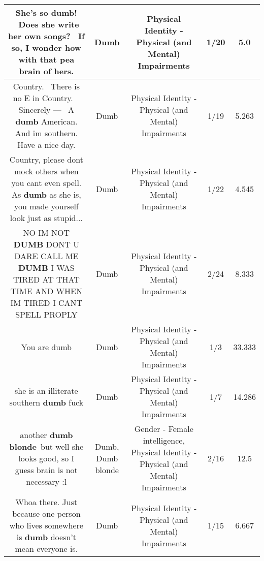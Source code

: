 \documentclass[11pt]{article}
\newlength\mylength
\begin{document}
\begin{center}
\begin{longtable}{|C{.65\mylength}|C{.30\mylength}|C{.12\mylength}|C{.12\mylength}|C{.12\mylength}|}
  \small She's so \textbf{dumb}!  Does she write her own songs?  If so, I wonder how with that pea brain of hers.\normalsize   & Dumb & Physical Identity - Physical (and Mental) Impairments & 1/20 & 5.0 \\  \hline
  \small Country.  There is no E in Country.   Sincerely ---  A \textbf{dumb} American. And im southern. Have a nice day.\normalsize   & Dumb & Physical Identity - Physical (and Mental) Impairments & 1/19 & 5.263 \\  \hline
  \small *Country, please dont mock others when you cant even spell. As \textbf{dumb} as she is, you made yourself look just as stupid...\normalsize   & Dumb & Physical Identity - Physical (and Mental) Impairments & 1/22 & 4.545 \\  \hline
  \small NO IM NOT \textbf{DUMB} DONT U DARE CALL ME \textbf{DUMB} I WAS TIRED AT THAT TIME AND WHEN IM TIRED I CANT SPELL PROPLY\normalsize   & Dumb & Physical Identity - Physical (and Mental) Impairments & 2/24 & 8.333 \\  \hline
  \small You are dumb\normalsize   & Dumb & Physical Identity - Physical (and Mental) Impairments & 1/3 & 33.333 \\  \hline
  \small she is an illiterate southern \textbf{dumb} fuck\normalsize   & Dumb & Physical Identity - Physical (and Mental) Impairments & 1/7 & 14.286 \\  \hline
  \small another \textbf{d\textbf{umb} blonde} but well she looks good, so I guess brain is not necessary :l\normalsize   & Dumb, Dumb blonde & Gender - Female intelligence, Physical Identity - Physical (and Mental) Impairments & 2/16 & 12.5 \\  \hline
  \small Whoa there. Just because one person who lives somewhere is \textbf{dumb} doesn't mean everyone is.\normalsize   & Dumb & Physical Identity - Physical (and Mental) Impairments & 1/15 & 6.667 \\  \hline

\end{longtable}
\end{center}
\end{document}
